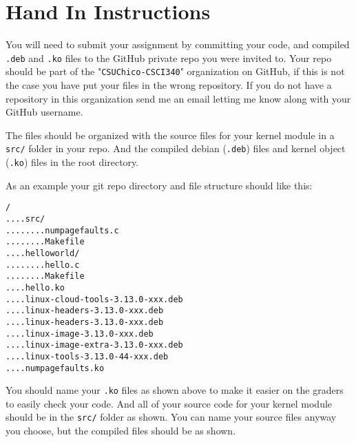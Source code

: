 \documentclass[11pt]{article}
\begin{document}
\newpage

\section*{Hand In Instructions}

You will need to submit your assignment by committing your code, and compiled {\tt .deb} and {\tt .ko} files to the GitHub private repo you were invited to. Your repo should be part of the "{\tt CSUChico-CSCI340}" organization on GitHub, if this is not the case you have put your files in the wrong repository. If you do not have a repository in this organization send me an email letting me know along with your GitHub username. 

The files should be organized with the source files for your kernel module in a {\tt src/} folder in your repo. And the compiled debian ({\tt .deb}) files and kernel object ({\tt .ko}) files in the root directory.  

As an example your git repo directory and file structure should like this:

\begin{verbatim}
/
....src/
........numpagefaults.c
........Makefile
....helloworld/
........hello.c
........Makefile
....hello.ko
....linux-cloud-tools-3.13.0-xxx.deb
....linux-headers-3.13.0-xxx.deb
....linux-headers-3.13.0-xxx.deb
....linux-image-3.13.0-xxx.deb
....linux-image-extra-3.13.0-xxx.deb
....linux-tools-3.13.0-44-xxx.deb
....numpagefaults.ko
\end{verbatim}

You should name your {\tt .ko} files as shown above to make it easier on the graders to easily check your code. And all of your source code for your kernel module should be in the {\tt src/} folder as shown. You can name your source files anyway you choose, but the compiled files should be as shown.
\newpage
\end{document}
